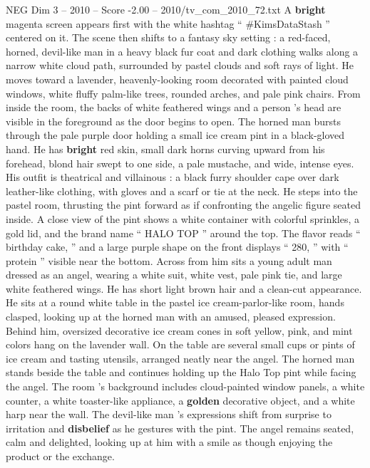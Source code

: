 \begin{textsample}{NEG Dim 3 – 2010 – Score -2.00 – 2010/tv\_com\_2010\_72.txt}  \label{ex:f3_neg_011}
A \textbf{bright} magenta screen appears first with the white hashtag “ \#KimsDataStash ” centered on it.
The scene then shifts to a fantasy sky setting : a red-faced, horned, devil-like man in a heavy black fur coat and dark clothing walks along a narrow white cloud path, surrounded by pastel clouds and soft rays of light.
He moves toward a lavender, heavenly-looking room decorated with painted cloud windows, white fluffy palm-like trees, rounded arches, and pale pink chairs.
From inside the room, the backs of white feathered wings and a person ’s head are visible in the foreground as the door begins to open.
The horned man bursts through the pale purple door holding a small ice cream pint in a black-gloved hand.
He has \textbf{bright} red skin, small dark horns curving upward from his forehead, blond hair swept to one side, a pale mustache, and wide, intense eyes.
His outfit is theatrical and villainous : a black furry shoulder cape over dark leather-like clothing, with gloves and a scarf or tie at the neck.
He steps into the pastel room, thrusting the pint forward as if confronting the angelic figure seated inside.
A close view of the pint shows a white container with colorful sprinkles, a gold lid, and the brand name “ HALO TOP ” around the top.
The flavor reads “ birthday cake, ” and a large purple shape on the front displays “ 280, ” with “ protein ” visible near the bottom.
Across from him sits a young adult man dressed as an angel, wearing a white suit, white vest, pale pink tie, and large white feathered wings.
He has short light brown hair and a clean-cut appearance.
He sits at a round white table in the pastel ice cream-parlor-like room, hands clasped, looking up at the horned man with an amused, pleased expression.
Behind him, oversized decorative ice cream cones in soft yellow, pink, and mint colors hang on the lavender wall.
On the table are several small cups or pints of ice cream and tasting utensils, arranged neatly near the angel.
The horned man stands beside the table and continues holding up the Halo Top pint while facing the angel.
The room ’s background includes cloud-painted window panels, a white counter, a white toaster-like appliance, a \textbf{golden} decorative object, and a white harp near the wall.
The devil-like man ’s expressions shift from surprise to irritation and \textbf{disbelief} as he gestures with the pint.
The angel remains seated, calm and delighted, looking up at him with a smile as though enjoying the product or the exchange.

\end{textsample}
